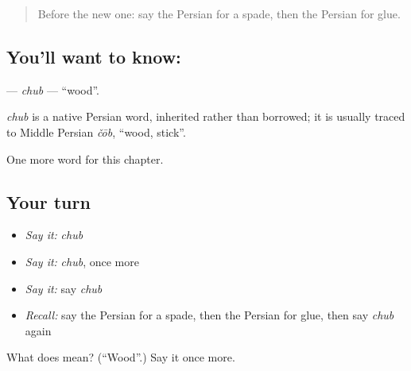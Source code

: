\begin{quote}
Before the new one: say the Persian for a spade, then the Persian for glue.
\end{quote}

\subsection*{You'll want to know: }
\textbf{} — \emph{chub} — \textquotedblleft{}wood\textquotedblright{}.

\begin{cousinweb}
\emph{chub} is a native Persian word, inherited rather than borrowed; it is usually traced to Middle Persian \emph{čōb}, \textquotedblleft{}wood, stick\textquotedblright{}.
\end{cousinweb}

\begin{grammarlens}[title={What you've built}]
One more word for this chapter.
\end{grammarlens}

\subsection*{Your turn}
\begin{itemize}
\raggedright
  \item \emph{Say it:} \emph{chub}
  \item \emph{Say it:} \emph{chub}, once more
  \item \emph{Say it:} say \emph{chub}
  \item \emph{Recall:} say the Persian for a spade, then the Persian for glue, then say \emph{chub} again
\end{itemize}

\begin{tcolorbox}[breakable,colback=teal!4,colframe=teal!35!black,title={Before you move on}]
What does  mean? (\textquotedblleft{}Wood\textquotedblright{}.) Say it once more.
\end{tcolorbox}
